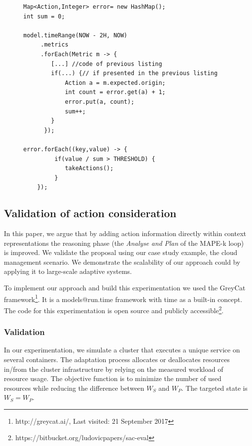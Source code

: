 \begin{figure}[ht!]
\begin{lstlisting}[style=customc,caption=Extraction of expected and measured value of a metric with a delta time,label=code:meta-supervision,basicstyle=\scriptsize]
Map<Action,Integer> error= new HashMap();
int sum = 0;

model.timeRange(NOW - 2H, NOW)
     .metrics
     .forEach(Metric m -> {
        [...] //code of previous listing
        if(...) {// if presented in the previous listing
            Action a = m.expected.origin;
            int count = error.get(a) + 1; 
            error.put(a, count);
            sum++;
        }
      });

error.forEach((key,value) -> {
         if(value / sum > THRESHOLD) {
            takeActions();
         }
    });
\end{lstlisting}	
\end{figure}





\subsection{Validation of action consideration}

In this paper, we argue that by adding action information directly within context representations the reasoning phase (\ie the \textit{Analyse and Plan} of the MAPE-k loop) is improved.
We validate the proposal using our case study example, the cloud management scenario.
We demonstrate the scalability of our approach could by applying it to large-scale adaptive systems.

To implement our approach and build this experimentation we used the GreyCat framework\footnote{http://greycat.ai/, Last visited: 21 September 2017}.
It is a models@run.time framework with time as a built-in concept\cite{DBLP:phd/basesearch/Hartmann16}.
The code for this experimentation is open source and publicly accessible\footnote{https://bitbucket.org/ludovicpapers/sac-eval}.

\subsubsection{Validation}
\label{sec:evaluation_setup}

In our experimentation, we simulate a cluster that executes a unique service on several containers.
The adaptation process allocates or deallocates resources in/from the cluster infrastructure by relying on the measured workload of resource usage.
The objective function is to minimize the number of used resources while reducing the difference between $W_S$ and $W_P$.
The targeted state is $W_S = W_P$.

